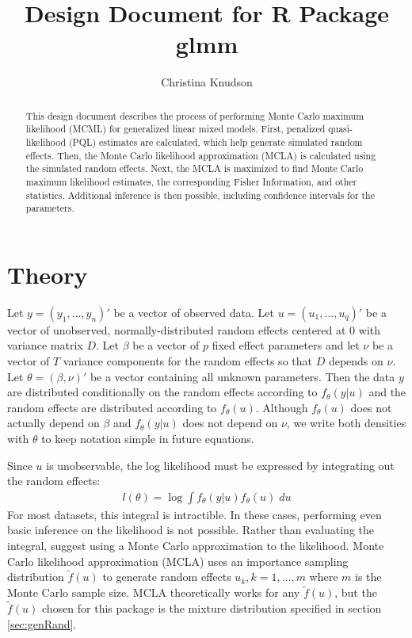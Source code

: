 \documentclass{article}
\title{Design Document for R Package glmm}
\author{Christina Knudson}
\begin{document}
\maketitle{}

\begin{abstract}
This design document describes the process of performing Monte Carlo maximum likelihood (MCML) for generalized linear mixed models.  First, penalized quasi-likelihood (PQL) estimates are calculated, which help generate simulated random effects. Then, the Monte Carlo likelihood approximation (MCLA)  is calculated using the simulated random effects. Next, the MCLA is maximized to find Monte Carlo maximum likelihood estimates, the corresponding Fisher Information, and other statistics. Additional inference is then possible, including confidence intervals for the parameters.
\end{abstract}

\section{Theory}

Let $y=(y_1, \ldots, y_n)'$ be a vector of observed data. Let $u=(u_1,\ldots,u_q)'$ be a vector of unobserved, normally-distributed random effects centered at 0 with variance matrix $D$. Let $\beta$ be a vector of $p$ fixed effect parameters and let $\nu$ be a vector of $T$ variance components for the random effects so that $D$ depends on $\nu$. Let $\theta=(\beta ,  \nu)'$ be a vector containing all unknown parameters. Then the data $y$ are distributed conditionally on the random effects according to $f_\theta(y|u)$ and the random effects are distributed according to $f_\theta(u)$. Although $f_\theta(u)$ does not actually depend on $\beta$ and $f_\theta(y|u)$ does not depend on $\nu$, we write both densities with $\theta$ to keep notation simple in future equations.

Since $u$ is unobservable, the log likelihood must be expressed by integrating out the random effects:
\begin{align}
l(\theta)=\log \int f_\theta(y|u) f_\theta(u) \; du
\end{align}
For most datasets, this integral is intractible. In these cases, performing even basic inference on the likelihood is not possible. Rather than evaluating the integral, \citet{geyer:thom:1992} suggest using a Monte Carlo approximation to the likelihood. Monte Carlo likelihood approximation (MCLA) uses an importance sampling distribution $\tilde{f}(u)$ to generate random effects $u_k, k=1, \ldots, m$ where $m$ is the Monte Carlo sample size.  MCLA theoretically works for any $\tilde{f}(u)$, but the  $\tilde{f}(u)$ chosen for this package is the mixture distribution specified in section \ref{sec:genRand}.
\end{document}
